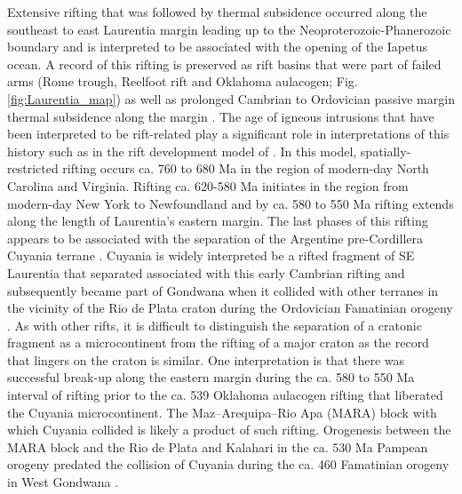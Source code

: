 \documentclass[11pt,letterpaper]{article}
\begin{document}
Extensive rifting that was followed by thermal subsidence occurred along the southeast to east Laurentia margin leading up to the Neoproterozoic-Phanerozoic boundary and is interpreted to be associated with the opening of the Iapetus ocean. A record of this rifting is preserved as rift basins that were part of failed arms (Rome trough, Reelfoot rift and Oklahoma aulacogen; Fig. \ref{fig:Laurentia_map}) as well as prolonged Cambrian to Ordovician passive margin thermal subsidence along the margin \citep{Bond1984a,Whitmeyer2007a}. The age of igneous intrusions that have been interpreted to be rift-related play a significant role in interpretations of this history such as in the rift development model of \citet{Burton2010a}. In this model, spatially-restricted rifting occurs ca. 760 to 680 Ma in the region of modern-day North Carolina and Virginia. Rifting ca. 620-580 Ma initiates in the region from modern-day New York to Newfoundland and by ca. 580 to 550 Ma rifting extends along the length of Laurentia's eastern margin. The last phases of this rifting appears to be associated with the separation of the Argentine pre-Cordillera Cuyania terrane \citep{Dickerson1998a}. Cuyania is widely interpreted be a rifted fragment of SE Laurentia that separated associated with this early Cambrian rifting and subsequently became part of Gondwana when it collided with other terranes in the vicinity of the Rio de Plata craton during the Ordovician Famatinian orogeny \citep{Martin2019a}. As with other rifts, it is difficult to distinguish the separation of a cratonic fragment as a microcontinent from the rifting of a major craton as the record that lingers on the craton is similar. One interpretation is that there was successful break-up along the eastern margin during the ca. 580 to 550 Ma interval of rifting prior to the ca. 539 Oklahoma aulacogen rifting that liberated the Cuyania microcontinent. The Maz–Arequipa–Rio Apa (MARA) block with which Cuyania collided \citep{Martin2019a} is likely a product of such rifting. Orogenesis between the MARA block and the Rio de Plata and Kalahari in the ca. 530 Ma Pampean orogeny \citep{Casquet2018a} predated the collision of Cuyania during the ca. 460 Famatinian orogeny in West Gondwana \citep{Rapalini2018a}. 
\end{document}
